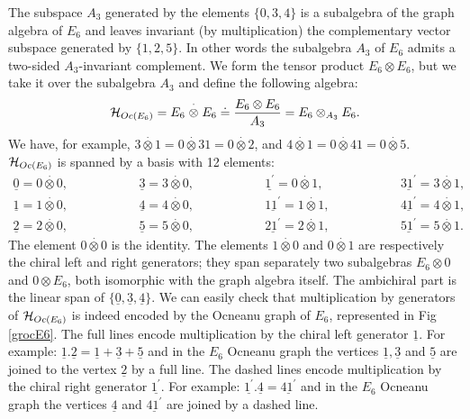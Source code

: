 \documentclass[a4paper,11pt]{article}
\def \otimesdot {\stackrel{\cdot}{\otimes}}
\newcommand{\ud}[1]{\underline{#1}}
\begin{document}
The subspace $A_3$ generated by the elements $\{ 0, 3, 4 \}$ is a
subalgebra of the graph
algebra of $E_6$ and leaves invariant (by multiplication) the
complementary vector subspace generated by $\{ 1, 2, 5 \}$.
In other words the subalgebra $A_{3}$ of $E_{6}$ admits a two-sided
$A_{3}$-invariant complement.
We form the tensor product $E_6 \otimes E_6$, but we take it over
the subalgebra $A_3$ and define the following algebra:
$$
{\cal H}_{Oc(E_6)} = E_6 \otimesdot E_6 \doteq
\frac{E_6 \otimes E_6}{A_3} = E_6 \otimes_{A_3} E_6 .
$$
We have, for example, $3 \otimesdot 1 = 0 \otimesdot 31 = 0 \otimesdot
2$, and $4 \otimesdot 1 = 0 \otimesdot 41 = 0 \otimesdot 5$.\\
${\cal H}_{Oc(E_6)}$ is spanned by a basis with 12 elements:
$$
\begin{array}{lclcrcr}
\ud0 = 0 \otimesdot 0, & \qquad \qquad  & \ud3 = 3 \otimesdot 0, &
\qquad \qquad &
\ud{1^{'}} = 0 \otimesdot 1,  & \qquad \qquad & \ud{31^{'}}=  3
\otimesdot 1, \\
\ud1 = 1 \otimesdot 0, & \qquad & \ud4 = 4 \otimesdot 0, & \qquad &
\ud{11^{'}}=  1 \otimesdot 1, & \qquad & \ud{41^{'}}=  4 \otimesdot 1, \\
\ud2 = 2 \otimesdot 0, & \qquad & \ud5 = 5 \otimesdot 0, & \qquad &
\ud{21^{'}}=  2 \otimesdot 1, & \qquad & \ud{51^{'}}=  5 \otimesdot 1.
\end{array}
$$
The element $ 0 \otimesdot 0$ is the identity. The elements $1 \otimesdot
0$ and $0 \otimesdot 1$ are respectively the chiral left and right
generators; they span separately two subalgebras $E_{6}\otimes 0$ and
$0 \otimes E_{6}$, both isomorphic with the graph algebra itself.
    The ambichiral part is the linear span of $\{\ud0, \ud3, \ud4 \}$.
We can easily check that multiplication by generators of
${\cal H}_{Oc(E_6)}$ is indeed encoded by the Ocneanu graph
of $E_6$, represented in Fig \ref{grocE6}. The full lines encode
multiplication by the chiral left generator $\ud1$. For example:
$\ud1 . \ud2 = \ud1 + \ud3 + \ud5$ and in the $E_6$ Ocneanu graph the
vertices $\ud1, \ud3$ and $\ud5$ are joined to the vertex $\ud2$ by a
full line.
The dashed lines encode multiplication by the chiral right generator
$\ud{1^{'}}$. For example: $\ud{1^{'}} . \ud4 = \ud{41^{'}}$ and in
the $E_6$ Ocneanu graph the vertices $\ud4$ and $\ud{41^{'}}$ are
joined  by a dashed line.
\end{document}
